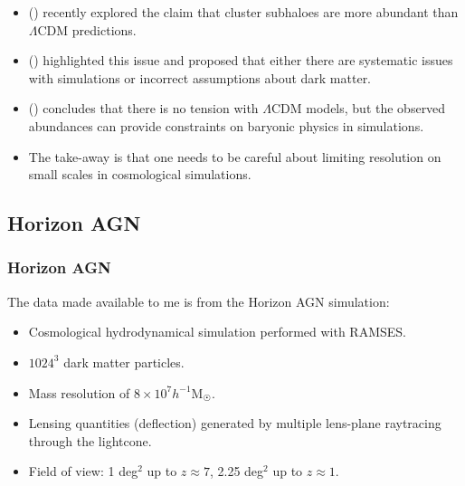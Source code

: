 \documentclass{beamer}
\begin{document}
  \begin{frame}
    \begin{itemize}
      \item (\cite{bah2021}) recently explored the claim that cluster subhaloes are more abundant than $\Lambda$CDM predictions.
      \item (\cite{M20}) highlighted this issue and proposed that either there are systematic issues with simulations or incorrect assumptions about dark matter.
      \item (\cite{bah2021}) concludes that there is no tension with $\Lambda$CDM models, but the observed abundances can provide constraints on baryonic physics in simulations.
      \item The take-away is that one needs to be careful about limiting resolution on small scales in cosmological simulations.
    \end{itemize}
  \end{frame}

  \subsection{Horizon AGN}

  \begin{frame}
    \frametitle{\sc Horizon AGN}
    The data made available to me is from the Horizon AGN simulation:
    \begin{itemize}
      \item Cosmological hydrodynamical simulation performed with RAMSES.
      \item $1024^3$ dark matter particles.
      \item Mass resolution of $8\times 10^7 h^{-1} \text{M}_{\astrosun}$.
      \item Lensing quantities (deflection) generated by multiple lens-plane raytracing through the lightcone.
      \item Field of view: 1 deg$^2$ up to $z\approx 7$, 2.25 deg$^2$ up to $z\approx 1$.
    \end{itemize}
  \end{frame}

  \begin{frame}
    
  \end{frame}
\end{document}
